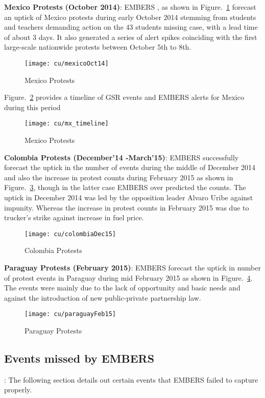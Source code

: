 \textbf{Mexico Protests (October 2014)}:
EMBERS , as shown in Figure.~\ref{fig:mexicoOct14} forecast an uptick of Mexico
protests during early October 2014 stemming from students and teachers demanding
action on the 43 students missing case, with a lead time of about 3
days. It also generated  a series of alert spikes coinciding with the first
large-scale nationwide protests between October 5th to 8th.

\begin{figure}[H]
\texttt{[image: cu/mexicoOct14]}
\caption{Mexico Protests}
\label{fig:mexicoOct14}
\end{figure}

Figure.~\ref{fig:mexicoTimeline} provides a timeline of GSR events and
EMBERS alerts for Mexico during this period
\begin{figure}[H]
\texttt{[image: cu/mx\_timeline]}
\caption{Mexico Protests}
\label{fig:mexicoTimeline}
\end{figure}

\textbf{Colombia Protests (December'14 -March'15)}:
EMBERS successfully forecast the uptick in the number of events during the
middle of December 2014 and also the increase in protest counts during February
2015 as shown in Figure.~\ref{fig:colombiaDec14}, though in the latter case EMBERS over predicted the counts. The uptick in
December 2014 was led by the opposition leader Alvaro Uribe against impunity.
Whereas the increase in  protest counts in February 2015
was due to trucker’s strike against increase in fuel price.

\begin{figure}[H]
\texttt{[image: cu/colombiaDec15]}
\caption{Colombia Protests}
\label{fig:colombiaDec14}
\end{figure}

\textbf{Paraguay Protests (February 2015)}:
EMBERS forecast the uptick in number of protest events in Paraguay during mid
February 2015 as shown in Figure.~\ref{fig:paraguay15}. The events were mainly due to the lack of opportunity and basic
needs and against the introduction of new public-private partnership law.

\begin{figure}[H]
\texttt{[image: cu/paraguayFeb15]}
\caption{Paraguay Protests}
\label{fig:paraguay15}
\end{figure}


\subsection{Events missed by EMBERS}:
The following section details out certain events that EMBERS failed to
capture properly.

